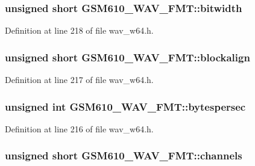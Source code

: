 \subsubsection[{\texorpdfstring{bitwidth}{bitwidth}}]{\setlength{\rightskip}{0pt plus 5cm}unsigned short G\+S\+M610\+\_\+\+W\+A\+V\+\_\+\+F\+M\+T\+::bitwidth}\hypertarget{struct_g_s_m610___w_a_v___f_m_t_a6a5b7355cb327bceb02ae311a12070a2}{}\label{struct_g_s_m610___w_a_v___f_m_t_a6a5b7355cb327bceb02ae311a12070a2}


Definition at line 218 of file wav\+\_\+w64.\+h.

\subsubsection[{\texorpdfstring{blockalign}{blockalign}}]{\setlength{\rightskip}{0pt plus 5cm}unsigned short G\+S\+M610\+\_\+\+W\+A\+V\+\_\+\+F\+M\+T\+::blockalign}\hypertarget{struct_g_s_m610___w_a_v___f_m_t_a1f84cf7bde5e0d1e1504e5c3358e6223}{}\label{struct_g_s_m610___w_a_v___f_m_t_a1f84cf7bde5e0d1e1504e5c3358e6223}


Definition at line 217 of file wav\+\_\+w64.\+h.

\subsubsection[{\texorpdfstring{bytespersec}{bytespersec}}]{\setlength{\rightskip}{0pt plus 5cm}unsigned {\bf int} G\+S\+M610\+\_\+\+W\+A\+V\+\_\+\+F\+M\+T\+::bytespersec}\hypertarget{struct_g_s_m610___w_a_v___f_m_t_a6264b5e791da1f5abc1948925601dacf}{}\label{struct_g_s_m610___w_a_v___f_m_t_a6264b5e791da1f5abc1948925601dacf}


Definition at line 216 of file wav\+\_\+w64.\+h.

\subsubsection[{\texorpdfstring{channels}{channels}}]{\setlength{\rightskip}{0pt plus 5cm}unsigned short G\+S\+M610\+\_\+\+W\+A\+V\+\_\+\+F\+M\+T\+::channels}\hypertarget{struct_g_s_m610___w_a_v___f_m_t_a66d6f77e9f228e4769162b2de69c8b96}{}\label{struct_g_s_m610___w_a_v___f_m_t_a66d6f77e9f228e4769162b2de69c8b96}


